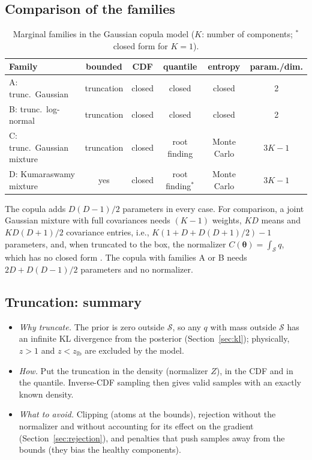 \documentclass[11pt,a4paper]{article}
\numberwithin{equation}{section}
\theoremstyle{plain}
\theoremstyle{definition}
\theoremstyle{remark}
\newcommand{\thetab}{\bm{\theta}}
\newcommand{\Sset}{\mathcal{S}}
\newcommand{\zlb}{z_{\text{lb}}}
\begin{document}
\subsection{Comparison of the families}
\begin{table}[h]
\centering
\caption{Marginal families in the Gaussian copula model ($K$: number of components; $^*$closed form for $K=1$).}
\label{tab:families}
\small
\begin{tabular}{@{}lccccc@{}}
\toprule
Family & bounded & CDF & quantile & entropy & param./dim. \\
\midrule
A: trunc.\ Gaussian & truncation & closed & closed & closed & 2 \\
B: trunc.\ log-normal & truncation & closed & closed & closed & 2 \\
C: trunc.\ Gaussian mixture & truncation & closed & root finding & Monte Carlo & $3K-1$ \\
D: Kumaraswamy mixture & yes & closed & root finding$^*$ & Monte Carlo & $3K-1$ \\
\bottomrule
\end{tabular}
\end{table}
The copula adds $D(D-1)/2$ parameters in every case. For comparison, a joint Gaussian mixture with full covariances needs $(K-1)$ weights, $KD$ means and $KD(D+1)/2$ covariance entries, i.e., $K(1+D+D(D+1)/2)-1$ parameters, and, when truncated to the box, the normalizer $C(\thetab)=\int_{\Sset} q$, which has no closed form \cite{fernandez2026pem}. The copula with families A or B needs $2D+D(D-1)/2$ parameters and no normalizer.

\subsection{Truncation: summary}
\begin{itemize}
\item \emph{Why truncate.} The prior is zero outside $\Sset$, so any $q$ with mass outside $\Sset$ has an infinite KL divergence from the posterior (Section~\ref{sec:kl}); physically, $z>1$ and $z<\zlb$ are excluded by the model.
\item \emph{How.} Put the truncation in the density (normalizer $Z$), in the CDF and in the quantile. Inverse-CDF sampling then gives valid samples with an exactly known density.
\item \emph{What to avoid.} Clipping (atoms at the bounds), rejection without the normalizer and without accounting for its effect on the gradient (Section~\ref{sec:rejection}), and penalties that push samples away from the bounds (they bias the healthy components).
\end{itemize}
\end{document}
